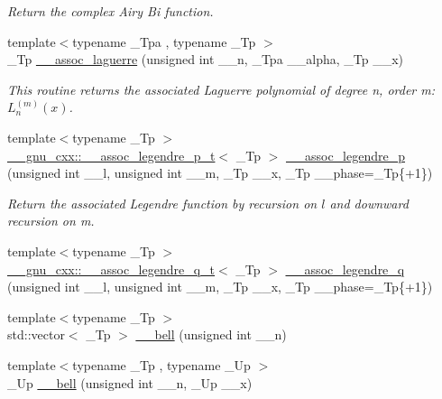 \begin{DoxyCompactItemize}
\begin{DoxyCompactList}\small\item\em Return the complex Airy Bi function. \end{DoxyCompactList}\item 
{\footnotesize template$<$typename \+\_\+\+Tpa , typename \+\_\+\+Tp $>$ }\\\+\_\+\+Tp \hyperlink{namespacestd_1_1____detail_a85319f12c991f6b19511d17413400b52}{\+\_\+\+\_\+assoc\+\_\+laguerre} (unsigned int \+\_\+\+\_\+n, \+\_\+\+Tpa \+\_\+\+\_\+alpha, \+\_\+\+Tp \+\_\+\+\_\+x)
\begin{DoxyCompactList}\small\item\em This routine returns the associated Laguerre polynomial of degree n, order m\+: $ L_n^{(m)}(x) $. \end{DoxyCompactList}\item 
{\footnotesize template$<$typename \+\_\+\+Tp $>$ }\\\hyperlink{struct____gnu__cxx_1_1____assoc__legendre__p__t}{\+\_\+\+\_\+gnu\+\_\+cxx\+::\+\_\+\+\_\+assoc\+\_\+legendre\+\_\+p\+\_\+t}$<$ \+\_\+\+Tp $>$ \hyperlink{namespacestd_1_1____detail_a34054ec9dd56cd3807582d0725f80088}{\+\_\+\+\_\+assoc\+\_\+legendre\+\_\+p} (unsigned int \+\_\+\+\_\+l, unsigned int \+\_\+\+\_\+m, \+\_\+\+Tp \+\_\+\+\_\+x, \+\_\+\+Tp \+\_\+\+\_\+phase=\+\_\+\+Tp\{+1\})
\begin{DoxyCompactList}\small\item\em Return the associated Legendre function by recursion on $ l $ and downward recursion on m. \end{DoxyCompactList}\item 
{\footnotesize template$<$typename \+\_\+\+Tp $>$ }\\\hyperlink{struct____gnu__cxx_1_1____assoc__legendre__q__t}{\+\_\+\+\_\+gnu\+\_\+cxx\+::\+\_\+\+\_\+assoc\+\_\+legendre\+\_\+q\+\_\+t}$<$ \+\_\+\+Tp $>$ \hyperlink{namespacestd_1_1____detail_abc21e6e1aa5290b46dbec04a81d14eec}{\+\_\+\+\_\+assoc\+\_\+legendre\+\_\+q} (unsigned int \+\_\+\+\_\+l, unsigned int \+\_\+\+\_\+m, \+\_\+\+Tp \+\_\+\+\_\+x, \+\_\+\+Tp \+\_\+\+\_\+phase=\+\_\+\+Tp\{+1\})
\item 
{\footnotesize template$<$typename \+\_\+\+Tp $>$ }\\std\+::vector$<$ \+\_\+\+Tp $>$ \hyperlink{namespacestd_1_1____detail_ae2c2fdeec1af50db0d274cae70168dc9}{\+\_\+\+\_\+bell} (unsigned int \+\_\+\+\_\+n)
\item 
{\footnotesize template$<$typename \+\_\+\+Tp , typename \+\_\+\+Up $>$ }\\\+\_\+\+Up \hyperlink{namespacestd_1_1____detail_a416c4b8a894dc8755484a8ad8740453a}{\+\_\+\+\_\+bell} (unsigned int \+\_\+\+\_\+n, \+\_\+\+Up \+\_\+\+\_\+x)

\end{DoxyCompactItemize}
